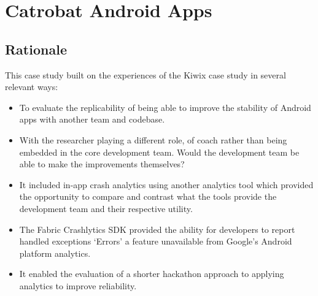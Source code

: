 \section{Catrobat Android Apps}
\label{section-catrobat-case-study}



\subsection*{Rationale}

This case study built on the experiences of the Kiwix case study in several relevant ways:
\begin{itemize}
    \item To evaluate the replicability of being able to improve the stability of Android apps with another team and codebase.
    \item With the researcher playing a different role, of coach rather than being embedded in the core development team. Would the development team be able to make the improvements themselves?
    \item It included in-app crash analytics using another analytics tool which provided the opportunity to compare and contrast what the tools provide the development team and their respective utility. 
    \item The Fabric Crashlytics SDK provided the ability for developers to report handled exceptions `Errors' a feature unavailable from Google's Android platform analytics.
    \item It enabled the evaluation of a shorter hackathon approach to applying analytics to improve reliability.
\end{itemize}



